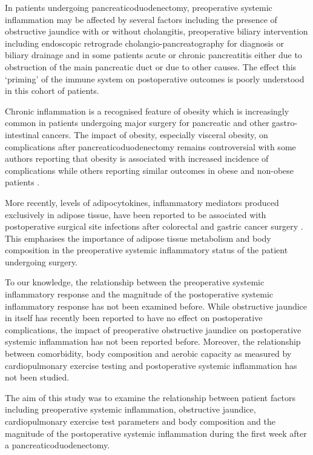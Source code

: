 In patients undergoing pancreaticoduodenectomy, preoperative systemic inflammation may be affected by several factors including the presence of obstructive jaundice with or without cholangitis, preoperative biliary intervention including endoscopic retrograde cholangio-pancreatography for diagnosis or biliary drainage and in some patients acute or chronic pancreatitis either due to obstruction of the main pancreatic duct or due to other causes. 
The effect this `priming' of the immune system on postoperative outcomes is poorly understood in this cohort of patients. 

Chronic inflammation is a recognised feature of obesity which is increasingly common in patients undergoing major surgery for pancreatic and other gastro-intestinal cancers. 
The impact of obesity, especially visceral obesity, on complications after pancreaticoduodenectomy remains controversial with some authors reporting that obesity is associated with increased incidence of complications \parencite{house_preoperative_2008, ramsey_body_2011} while others reporting similar outcomes in obese and non-obese patients \parencite{khan_does_2010, tsai_impact_2010, balentine_obesity_2011}. 

More recently, levels of adipocytokines, inflammatory mediators produced exclusively in adipose tissue, have been reported to be associated with postoperative surgical site infections after colorectal \parencite{ortega-deballon_preoperative_2013, matsuda_preoperative_2009} and gastric cancer surgery \parencite{yamamoto_association_2013}.
This emphasises the importance of adipose tissue metabolism and body composition in the preoperative systemic inflammatory status of the patient undergoing surgery. 

To our knowledge, the relationship between the preoperative systemic inflammatory response and the magnitude of the postoperative systemic inflammatory response has not been examined before. 
While obstructive jaundice in itself has recently been reported to have no effect on postoperative complications, the impact of preoperative obstructive jaundice on postoperative systemic inflammation has not been reported before. 
Moreover, the relationship between comorbidity, body composition and aerobic capacity as measured by cardiopulmonary exercise testing and postoperative systemic inflammation has not been studied. 

The aim of this study was to examine the relationship between patient factors including preoperative systemic inflammation, obstructive jaundice, cardiopulmonary exercise test parameters and body composition and the magnitude of the postoperative systemic inflammation during the first week after a pancreaticoduodenectomy. 

